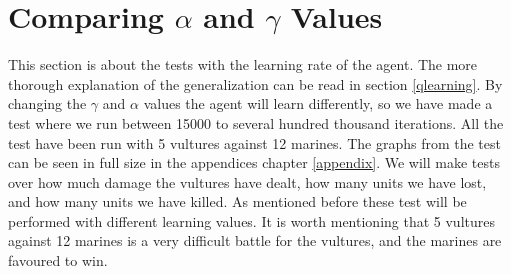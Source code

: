 \section{Comparing $\alpha$ and $\gamma$ Values}
This section is about the tests with the learning rate of the agent. The more thorough explanation of the generalization can be read in section \ref{qlearning}.
By changing the $\gamma$ and $\alpha$ values the agent will learn differently,  so we have made a test where we run between 15000 to several hundred thousand iterations. All the test have been run with 5 vultures against 12 marines. The graphs from the test can be seen in full size in the appendices chapter \ref{appendix}. We will make tests over how much damage the vultures have dealt, how many units we have lost, and how many units we have killed. As mentioned before  these test will be performed with different learning values. It is worth mentioning that 5 vultures against 12 marines is a very difficult battle for the vultures, and the marines are favoured to win.


